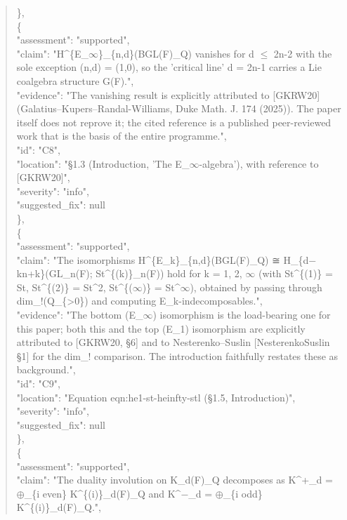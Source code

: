 \documentclass[11pt]{article}
\begin{document}
\begin{quote}
    \},\\
    \{\\
      "assessment": "supported",\\
      "claim": "H\^{}\{E\_\ensuremath{\infty}\}\_\{n,d\}(BGL(F)\_Q) vanishes for d \ensuremath{\le} 2n-2 with the sole exception (n,d) = (1,0), so the 'critical line' d = 2n-1 carries a Lie coalgebra structure G(F).",\\
      "evidence": "The vanishing result is explicitly attributed to [GKRW20] (Galatius--Kupers--Randal-Williams, Duke Math. J. 174 (2025)). The paper itself does not reprove it; the cited reference is a published peer-reviewed work that is the basis of the entire programme.",\\
      "id": "C8",\\
      "location": "§1.3 (Introduction, 'The E\_\ensuremath{\infty}-algebra'), with reference to [GKRW20]",\\
      "severity": "info",\\
      "suggested\_fix": null\\
    \},\\
    \{\\
      "assessment": "supported",\\
      "claim": "The isomorphisms H\^{}\{E\_k\}\_\{n,d\}(BGL(F)\_Q) ≅ H\_\{d\ensuremath{-}kn+k\}(GL\_n(F); St\^{}\{(k)\}\_n(F)) hold for k = 1, 2, \ensuremath{\infty} (with St\^{}\{(1)\} = St, St\^{}\{(2)\} = St\^{}2, St\^{}\{(\ensuremath{\infty})\} = St\^{}\ensuremath{\infty}), obtained by passing through dim\_!(Q\_\{>0\}) and computing E\_k-indecomposables.",\\
      "evidence": "The bottom (E\_\ensuremath{\infty}) isomorphism is the load-bearing one for this paper; both this and the top (E\_1) isomorphism are explicitly attributed to [GKRW20, §6] and to Nesterenko--Suslin [NesterenkoSuslin §1] for the dim\_! comparison. The introduction faithfully restates these as background.",\\
      "id": "C9",\\
      "location": "Equation eqn:he1-st-heinfty-stl (§1.5, Introduction)",\\
      "severity": "info",\\
      "suggested\_fix": null\\
    \},\\
    \{\\
      "assessment": "supported",\\
      "claim": "The duality involution on K\_d(F)\_Q decomposes as K\^{}+\_d = \ensuremath{\oplus}\_\{i even\} K\^{}\{(i)\}\_d(F)\_Q and K\^{}\ensuremath{-}\_d = \ensuremath{\oplus}\_\{i odd\} K\^{}\{(i)\}\_d(F)\_Q.",\\

\end{quote}
\end{document}
